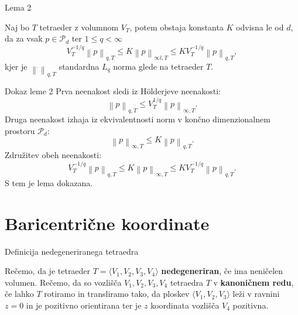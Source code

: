 \documentclass{beamer}
\begin{document}
\begin{frame}{Lema 2}
\begin{lemma}\label{lema_norma}
    Naj bo $T$ tetraeder z volumnom $V_T$, potem obstaja 
    konstanta $K$ odvisna le od $d$, da za vsak  $p \in \mathcal{P}_d$ ter $1 \le q < \infty$
    \begin{equation}
        V_T^{-1/q} \left\lVert p \right\rVert_{q,T} \le K \left\lVert p \right\rVert_{\infty l, T} \le K V_T^{-1/q} \left\lVert p \right\rVert_{q,T},
    \end{equation}
    kjer je $\left\lVert \dot{} \right\rVert_{q,T}$ standardna $L_q$ norma 
    glede na tetraeder $T$.
\end{lemma}
\end{frame}


\begin{frame}{Dokaz leme 2}
    Prva neenakost sledi iz Hölderjeve neenakosti:
    \[
        \left\lVert p \right\rVert_{q,T} \leq V_T^{1/q} \left\lVert p \right\rVert_{\infty, T}.
    \]
    Druga neenakost izhaja iz ekvivalentnosti norm v končno dimenzionalnem prostoru $\mathcal{P}_d$:
    \[
        \left\lVert p \right\rVert_{\infty, T} \leq K \left\lVert p \right\rVert_{q,T}.
    \]
    Združitev obeh neenakosti:
    \[
        V_T^{-1/q} \left\lVert p \right\rVert_{q,T} \leq K \left\lVert p \right\rVert_{\infty, T} \leq K V_T^{-1/q} \left\lVert p \right\rVert_{q,T}.
    \]
    S tem je lema dokazana.
\end{frame}

\section{Baricentrične koordinate}
\begin{frame}{Definicija nedegeneriranega tetraedra}
 \begin{definition}
    Rečemo, da je tetraeder $T = \langle V_1, V_2, V_3, V_4 \rangle$ \textbf{nedegeneriran}, če ima neničelen volumen. Rečemo, da so vozlišča $V_1 , V_2 , V_3, V_4$ tetraedra $T$ v \textbf{kanoničnem redu}, če lahko $T$ rotiramo in transliramo  tako, da ploskev $\langle V_1, V_2, V_3\rangle$ leži v ravnini $z = 0$ in je pozitivno orientirana ter je $z$ koordinata vozlišča $V_4$ pozitivna.
\end{definition}
\end{frame}
\end{document}
